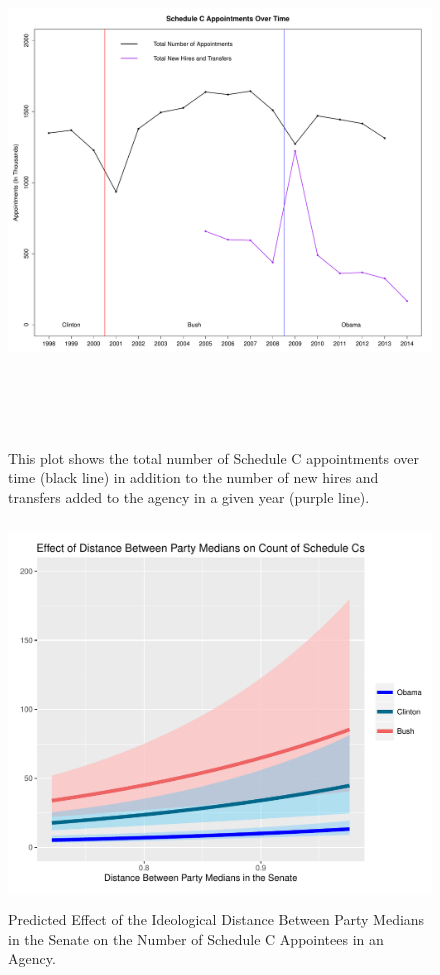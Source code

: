 \documentclass[12pt]{article}
\begin{document}
\newpage
\begin{figure}[!htb]
\begin{center}
\includegraphics[height=5.5in,width=7in]{SCAptsandAccOverTime.pdf}
\caption{This plot shows the total number of Schedule C appointments over time (black line) in addition to the number of new hires and transfers added to the agency in a given year (purple line).}
\end{center}
\end{figure}

\newpage
\begin{figure}[!h]
\begin{center}
\includegraphics[height=4in,width=4.5in]{ResultsPlots.pdf}
\caption{Predicted Effect of the Ideological Distance Between Party Medians in the Senate on the Number of Schedule C Appointees in an Agency.}
\end{center}
\end{figure}
\end{document}
